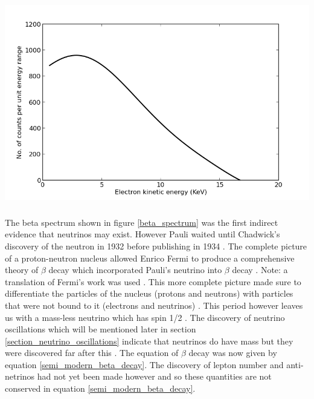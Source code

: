 \documentclass[12pt,a4paper]{article}
\newenvironment{Figure}
  {\par\medskip\noindent\minipage{\linewidth}}
  {\endminipage\par\medskip}
\begin{document}
\begin{Figure}
 \centering
 \includegraphics[height=90mm]{beta_spectrum.png}
 \label{beta_spectrum}
\end{Figure}

The beta spectrum shown in figure \ref{beta_spectrum} was the first indirect evidence that neutrinos may exist. However Pauli waited until Chadwick's discovery of the neutron in 1932 \cite{chadwick1932possible} before publishing in 1934 \cite{lederman1970resource}. The complete picture of a proton-neutron nucleus allowed Enrico Fermi to produce a comprehensive theory of $\beta$ decay which incorporated Pauli's neutrino into $\beta$ decay \cite{lederman1970resource} \cite{Fermi:1934hr}. Note: a translation of Fermi's work was used \cite{wilson1968fermi}. This more complete picture made sure to differentiate the particles of the nucleus (protons and neutrons) with particles that were not bound to it (electrons and neutrinos) \cite{Fermi:1934hr} \cite{wilson1968fermi}. This period however leaves us with a mass-less neutrino which has spin 1/2 \cite{lederman1970resource}. The discovery of neutrino oscillations which will be mentioned later in section \ref{section_neutrino_oscillations} indicate that neutrinos do have mass but they were discovered far after this \cite{griffiths2008introduction}. The equation of $\beta$ decay was now given by equation \ref{semi_modern_beta_decay}. The discovery of lepton number and anti-netrinos had not yet been made however and so these quantities are not conserved in equation \ref{semi_modern_beta_decay}. 
\end{document}
